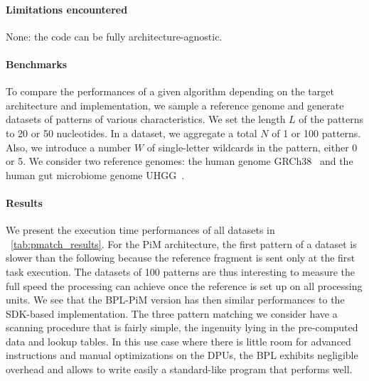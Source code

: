 \paragraph{Limitations encountered}
None: the code can be fully architecture-agnostic.

\paragraph{Benchmarks}

To compare the performances of a given algorithm depending on the target architecture and implementation, we sample a reference genome and generate datasets of patterns of various characteristics.
We set the length $L$ of the patterns to 20 or 50 nucleotides.
In a dataset, we aggregate a total $N$ of 1 or 100 patterns.
Also, we introduce a number $W$ of single-letter wildcards in the pattern, either 0 or 5.
We consider two reference genomes: the human genome GRCh38~\cite{HG38} and the human gut microbiome genome UHGG~\cite{UHGG}.

\paragraph{Results} We present the execution time performances of all datasets in \tablename~\ref{tab:pmatch_results}.
For the PiM architecture, the first pattern of a dataset is slower than the following because the reference fragment is sent only at the first task execution.
The datasets of 100 patterns are thus interesting to measure the full speed the processing can achieve once the reference is set up on all processing units.
We see that the BPL-PiM version has then similar performances to the SDK-based implementation.
The three pattern matching we consider have a scanning procedure that is fairly simple, the ingenuity lying in the pre-computed data and lookup tables.
In this use case where there is little room for advanced instructions and manual optimizations on the DPUs, the BPL exhibits negligible overhead and allows to write easily a standard-like program that performs well.

